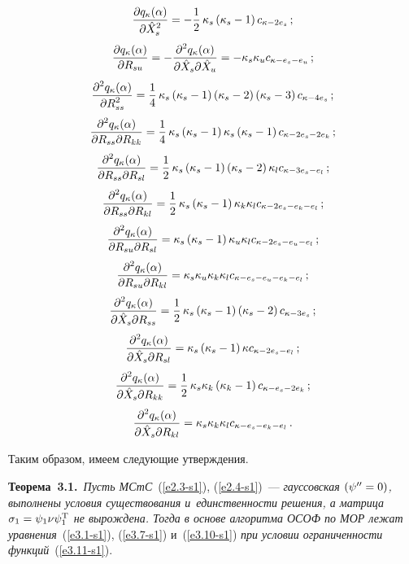 \begin{multicols}{2}
$$    \displaystyle\frac{\displaystyle \partial q_\kappa (\alpha) \mathstrut}{\displaystyle \partial \hat X_s^2\mathstrut} = -\displaystyle\frac{\displaystyle 1\mathstrut}{\displaystyle 2\mathstrut}\,
    \kappa_s \left(\kappa_s-1\right) c_{\kappa- 2 e_s}\,;
    $$
    $$
    \displaystyle\frac{\displaystyle \partial q_\kappa (\alpha)\mathstrut}{\displaystyle \partial   R_{su}\mathstrut}= -
    \displaystyle\frac{\displaystyle \partial^2 q_\kappa (\alpha)\mathstrut}{\displaystyle \partial \hat X_s \partial
    \hat X_u\mathstrut} = -\kappa_s \kappa_u c_{\kappa- e_s-e_u}\,;
    $$
    $$
    \displaystyle\frac{\displaystyle \partial^2 q_\kappa  (\alpha)\mathstrut}{\displaystyle \partial R_{ss}^2\mathstrut}= \displaystyle\frac{\displaystyle 1\mathstrut}{\displaystyle 4\mathstrut}\,
    \kappa_s\left(\kappa_s -1\right)
    \left(\kappa_s -2\right) \left(\kappa_s-3\right) c_{\kappa- 4e_s}\,;
    $$
    $$
    \displaystyle\frac{\displaystyle  \partial^2 q_\kappa     (\alpha)\mathstrut}{\displaystyle \partial R_{ss} \partial R_{kk}\mathstrut}= 
    \displaystyle\frac{\displaystyle 1\mathstrut}{\displaystyle 4\mathstrut}\,\kappa_s\left(\kappa_s -1\right)\kappa_s \left(\kappa_s -1\right) 
     c_{\kappa- 2e_s- 2  e_k}\,;
     $$
    $$
    \displaystyle\frac{\displaystyle \partial^2 q_\kappa     (\alpha)\mathstrut}{\displaystyle \partial R_{ss} \partial R_{sl}\mathstrut}= \displaystyle\frac{\displaystyle 1\mathstrut}{\displaystyle 2\mathstrut}\,
    \kappa_s\left(\kappa_s -1\right) \left(\kappa_s -2\right) \kappa_l c_{\kappa- 3e_s- e_l}\,;
    $$
    $$
    \displaystyle\frac{\displaystyle \partial^2 q_\kappa     (\alpha)\mathstrut}{\displaystyle \partial R_{ss} \partial R_{kl}\mathstrut}= \displaystyle\frac{\displaystyle 1\mathstrut}{\displaystyle 2\mathstrut}\,
    \kappa_s\left(\kappa_s -1\right) \kappa_k \kappa_l c_{\kappa- 2e_s-e_k- e_l}\,;
    $$
    $$
    \displaystyle\frac{\displaystyle \partial^2 q_\kappa     (\alpha)\mathstrut}{\displaystyle \partial R_{su} \partial R_{sl}\mathstrut}= 
    \kappa_s\left(\kappa_s -1\right)
    \kappa_u \kappa_l c_{\kappa- 2e_s-e_u-  e_l}\,;
    $$
    $$
    \displaystyle\frac{\displaystyle \partial^2 q_\kappa (\alpha)\mathstrut}{\displaystyle \partial R_{su} \partial R_{kl}\mathstrut}=
    \kappa_s\kappa_u \kappa_k\kappa_l c_{\kappa- e_s-e_u-e_k-e_l}\,;
    $$
    $$
    \displaystyle\frac{\displaystyle \partial^2 q_\kappa     (\alpha)\mathstrut}{\displaystyle \partial \hat X_s \partial R_{ss}\mathstrut}= \displaystyle\frac{\displaystyle 1\mathstrut}{\displaystyle 2\mathstrut}\,
    \kappa_s\left(\kappa_s -1\right) \left(\kappa_s -2\right) c_{\kappa- 3e_s}\,;
    $$
    $$
    \displaystyle\frac{\displaystyle \partial^2 q_\kappa     (\alpha)\mathstrut}{\displaystyle \partial \hat X_s \partial R_{sl}\mathstrut}= 
    \kappa_s\left(\kappa_s -1\right)  \kappa c_{\kappa- 2e_s- e_l}\,;
    $$
    $$
    \displaystyle\frac{\displaystyle \partial^2 q_\kappa     (\alpha)\mathstrut}{\displaystyle \partial \hat X_s \partial R_{kk}\mathstrut}= \displaystyle\frac{\displaystyle 1\mathstrut}{\displaystyle 2\mathstrut}\,
    \kappa_s\kappa_k \left(\kappa_k -1\right) c_{\kappa- e_s-2     e_k}\,;
    $$
    $$
    \displaystyle\frac{\displaystyle \partial^2 q_\kappa     (\alpha)\mathstrut}{\displaystyle \partial \hat X_s \partial R_{kl}\mathstrut}= \kappa_s
    \kappa_k     \kappa_l c_{\kappa- e_s-e_k-     e_l}\,.
 $$

Таким образом, имеем следующие утверждения.

\smallskip

\noindent
\textbf{Теорема~3.1.}\ \textit{Пусть МСтС}~(\ref{e2.3-s1}), (\ref{e2.4-s1})~--- 
\textit{гауссовская
$(\psi'' \hm=0)$, выполнены условия существования и~единственности
решения, а матрица $\si_1 \hm= \psi_1 \nu \psi_1^{\mathrm{T}}$ не вырождена. Тогда
в основе алгоритма ОСОФ по МОР лежат уравнения}~(\ref{e3.1-s1}), (\ref{e3.7-s1})
и~(\ref{e3.10-s1}) \textit{при условии ограниченности функций}~(\ref{e3.11-s1}).


\end{multicols}
